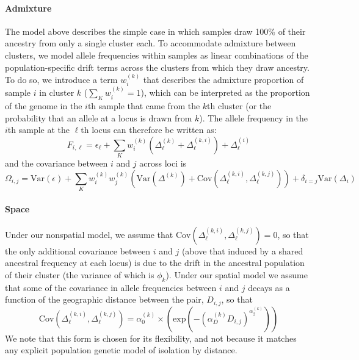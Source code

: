 \documentclass[12pt]{article}
\begin{document}
\paragraph{Admixture} 
The model above describes the simple case 
in which samples draw 100\% of their ancestry from only a single cluster each. 
To accommodate admixture between clusters, 
we model allele frequencies within samples as linear combinations of the population-specific 
drift terms across the clusters from which they draw ancestry.
To do so, we introduce a term $w^{(k)}_{i}$ that describes the
admixture proportion of sample $i$ in cluster $k$ ($\sum_{K}w^{(k)}_{i} = 1$),
which can be interpreted as the proportion of the genome in the $i$th
sample that came from the $k$th cluster 
(or the probability that an allele at a locus is drawn from $k$).
The allele frequency in the $i$th sample at the $\ell$th locus can therefore be written as:
\begin{equation}
F_{i,\ell} = \epsilon_{\ell} + \sum\limits_{K} w^{(k)}_{i}\left( 
  \Delta^{(k)}_{\ell} + \Delta^{(k,i)}_{\ell}\right) + \Delta^{(i)}_{\ell}	
\label{drift_terms_admix}
\end{equation}
and the covariance between $i$ and $j$ across loci is
\begin{equation}
\Omega_{i,j} = \text{Var}(\epsilon) + \sum\limits_K w^{(k)}_iw^{(k)}_j
\left(
  \text{Var}\left( \Delta^{(k)} \right) +
\text{Cov}(\Delta^{(k,i)}_{\ell},\Delta^{(k,j)}_{\ell}) 	\right) +
\delta_{i=j} \text{Var}(\Delta_i)
\label{admixed_spatial_cov}
\end{equation}

\paragraph{Space}
Under our nonspatial model, 
we assume that $\text{Cov}(\Delta^{(k,i)}_{\ell},\Delta^{(k,j)}_{\ell})=0$,
so that the only additional covariance between $i$ and $j$ 
(above that induced by a shared ancestral frequency at each locus)
is due to the drift in the ancestral population of their cluster 
(the variance of which is $\phi_k$). 
Under our spatial model we assume that some of the covariance in allele frequencies
between $i$ and $j$ decays as a function of the geographic distance
between the pair, $D_{i,j}$,
so that 
\begin{equation}
\text{Cov}(\Delta^{(k,i)}_{\ell},\Delta^{(k,j)}_{\ell}) = \alpha^{(k)}_0 \times \left(\text{exp} \left(  -(\alpha^{(k)}_D D_{i,j})^{\alpha^{(k)}_2}\right) \right)
\end{equation}
We note that this form is chosen for its flexibility, 
and not because it matches any explicit population genetic model of isolation by distance. 
\end{document}
